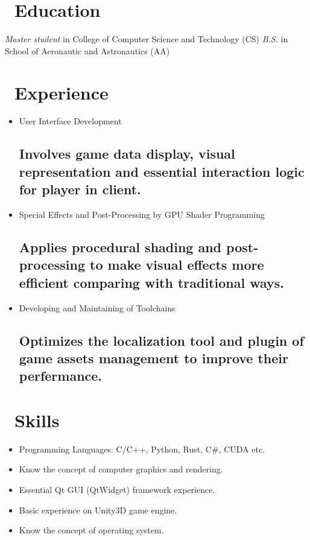 \documentclass{resume}
\begin{document}



\section{\faGraduationCap\ Education}
\textit{Master student} in College of Computer Science and Technology (CS)
\textit{B.S.} in School of Aeronautic and Astronautics (AA)

\section{\faUsers\ Experience}
\role{Game Client Developer}{}
\begin{itemize}
  \item User Interface Development
  \subsection{Involves game data display, visual representation and essential interaction logic for player in client.}

  \item Special Effects and Post-Processing by GPU Shader Programming
  \subsection{Applies procedural shading and post-processing to make visual effects more efficient comparing with traditional ways.}

  \item Developing and Maintaining of Toolchains
  \subsection{Optimizes the localization tool and plugin of game assets management to improve their perfermance.}

\end{itemize}

\section{\faCogs\ Skills}
\begin{itemize}[parsep=0.5ex]
  \item Programming Languages: C/C++, Python, Rust, C\#, CUDA etc.
  \item Know the concept of computer graphics and rendering.
  \item Essential Qt GUI (QtWidget) framework experience.
  \item Basic experience on Unity3D game engine.
  \item Know the concept of operating system.
\end{itemize}
\end{document}

